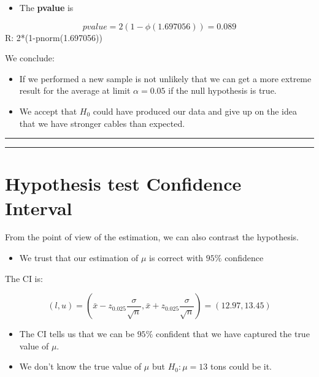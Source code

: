 \documentclass[
]{book}
\providecommand{\tightlist}{%
  \setlength{\itemsep}{0pt}\setlength{\parskip}{0pt}}
\begin{document}
\begin{itemize}
\tightlist
\item
  The \textbf{pvalue} is
\end{itemize}

\[pvalue=2 (1-\phi(1.697056))=0.089\]
R: 2*(1-pnorm(1.697056))

We conclude:

\begin{itemize}
\item
  If we performed a new sample is not unlikely that we can get a more extreme result for the average at limit \(\alpha=0.05\) if the null hypothesis is true.
\item
  We accept that \(H_0\) could have produced our data and give up on the idea that we have stronger cables than expected.
\end{itemize}

\begin{center}\rule{0.5\linewidth}{0.5pt}\end{center}

\begin{center}\rule{0.5\linewidth}{0.5pt}\end{center}

\hypertarget{hypothesis-test-confidence-interval}{%
\section{Hypothesis test Confidence Interval}\label{hypothesis-test-confidence-interval}}

From the point of view of the estimation, we can also contrast the hypothesis.

\begin{itemize}
\tightlist
\item
  We trust that our estimation of \(\mu\) is correct with \(95\%\) confidence
\end{itemize}

The CI is:

\[(l,u)=(\bar{x}-z_{0.025} \frac{\sigma}{\sqrt{n}}, \bar{x}+z_{0.025} \frac{\sigma}{\sqrt{n}})= (12.97,13.45)\]

\begin{itemize}
\item
  The CI tells us that we can be \(95\%\) confident that we have captured the true value of \(\mu\).
\item
  We don't know the true value of \(\mu\) but \(H_0: \mu=13\) tons could be it.
\end{itemize}
\end{document}
